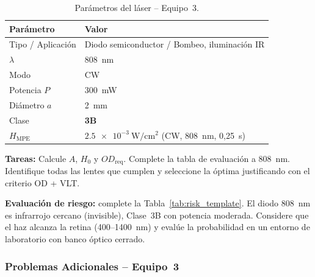 \documentclass[12pt,a4paper]{article}
\begin{document}
\begin{table}[H]
	\centering
	\caption{Parámetros del láser -- Equipo~3.}
	\small
	\begin{tabular}{l l}
		\toprule
		\textbf{Parámetro} & \textbf{Valor}                                                    \\
		\midrule
		Tipo / Aplicación  & Diodo semiconductor / Bombeo, iluminación IR                      \\
		$\lambda$          & 808~nm                                                            \\
		Modo               & CW                                                                \\
		Potencia $P$       & 300~mW                                                            \\
		Diámetro $a$       & 2~mm                                                              \\
		\rowcolor{aeroyellow!30}
		Clase              & \textbf{3B}                                                       \\
		$H_{\mathrm{MPE}}$ & $\SI{2.5e-3}{\watt\per\centi\metre\squared}$ (CW, 808~nm, 0,25~s) \\
		\bottomrule
	\end{tabular}
\end{table}

\textbf{Tareas:} Calcule $A$, $H_0$ y $OD_{\mathrm{req}}$. Complete la tabla
de evaluación a 808~nm. Identifique todas las lentes que cumplen y seleccione
la óptima justificando con el criterio OD + VLT.

\textbf{Evaluación de riesgo:} complete la Tabla~\ref{tab:risk_template}.
El diodo 808~nm es infrarrojo cercano (invisible), Clase~3B con potencia
moderada. Considere que el haz alcanza la retina (400--1400~nm) y evalúe la
probabilidad en un entorno de laboratorio con banco óptico cerrado.

\subsubsection*{Problemas Adicionales -- Equipo~3}
\end{document}
